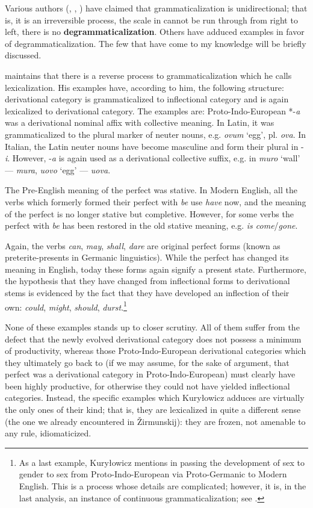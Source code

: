 Various authors (\citet[96]{Givón1975}, \citet[103f]{Langacker1977}, \citet[56--60]{Vincent1980b}) have claimed that grammaticalization is unidirectional; that is, it is an irreversible process, the scale in  cannot be run through from right to left, there is no \textbf{degrammaticalization}. Others have adduced examples in favor of degrammaticalization. The few that have come to my knowledge will be briefly discussed.

\citet[52f]{Kuryłowicz1965} maintains that there is a reverse process to grammaticalization which he calls lexicalization. His examples have, according to him, the following structure: derivational category is grammaticalized to inflectional category and is again lexicalized to derivational category. The examples are: Proto-Indo-European *-\textit{a} was a derivational nominal affix with collective meaning. In Latin, it was grammaticalized to the plural marker of neuter nouns, e.g. \textit{ovum} ‘egg’, pl. \textit{ova}. In Italian, the Latin neuter nouns have become masculine and form their plural in -\textit{i}. However, -\textit{a} is again used as a derivational collective suffix, e.g. in \textit{muro} ‘wall’ — \textit{mura}, \textit{uovo} ‘egg’ — \textit{uova}.

The Pre-English meaning of the perfect was stative. In Modern English, all the verbs which formerly formed their perfect with \textit{be} use \textit{have} now, and the meaning of the perfect is no longer stative but completive. However, for some verbs the perfect with \textit{be} has been restored in the old stative meaning, e.g. \textit{is come}/\textit{gone}.

Again, the verbs \textit{can}, \textit{may}, \textit{shall}, \textit{dare} are original perfect forms (known as preterite-presents in Germanic linguistics). While the perfect has changed its meaning in English, today these forms again signify a present state. Furthermore, the hypothesis that they have changed from inflectional forms to derivational stems is evidenced by the fact that they have developed an inflection of their own: \textit{could}, \textit{might}, \textit{should}, \textit{durst}.\footnote{As a last example, Kuryłowicz mentions in passing the development of sex to gender to sex from Proto-Indo-European via Proto-Germanic to Modern English. This is a process whose details are complicated; however, it is, in the last analysis, an instance of continuous grammaticalization; see \citet[§~7.2]{Lehmann1982b}.}

None of these examples stands up to closer scrutiny. All of them suffer from the defect that the newly evolved derivational category does not possess a minimum of productivity, whereas those Proto-Indo-European derivational categories which they ultimately go back to (if we may assume, for the sake of argument, that perfect was a derivational category in Proto-Indo-European) must clearly have been highly productive, for otherwise they could not have yielded inflectional categories. Instead, the specific examples which Kuryłowicz adduces are virtually the only ones of their kind; that is, they are lexicalized in quite a different sense (the one we already encountered in Žirmunskij): they are frozen, not amenable to any rule, idiomaticized.

